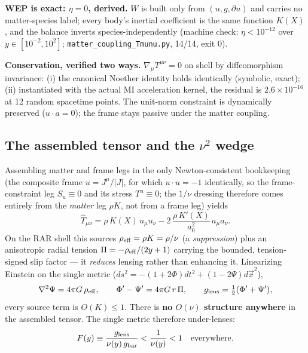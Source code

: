 \documentclass[11pt]{article}
\newcommand{\gbar}{g_{\rm bar}}
\newcommand{\glens}{g_{\rm lens}}
\begin{document}
\textbf{WEP is exact: $\eta=0$, derived.} $W$ is built only from $(u,g,\partial u)$ and carries no matter-species label; every body's inertial coefficient is the same function $K(X)$, and the balance inverts species-independently (machine check: $\eta<10^{-12}$ over $y\in[10^{-2},10^2]$; \texttt{matter\_coupling\_Tmunu.py}, 14/14, exit 0).

\textbf{Conservation, verified two ways.} $\nabla_\mu T^{\mu\nu}=0$ on shell by diffeomorphism invariance: (i) the canonical Noether identity holds identically (symbolic, exact); (ii) instantiated with the actual MI acceleration kernel, the residual is $2.6\times10^{-16}$ at 12 random spacetime points. The unit-norm constraint is dynamically preserved ($u\cdot a=0$); the frame stays passive under the matter coupling.

\subsection{The assembled tensor and the $\nu^2$ wedge}\label{sec:wedge}

Assembling matter and frame legs in the only Newton-consistent bookkeeping (the composite frame $u=J^\mu/|J|$, for which $u\cdot u=-1$ identically, so the frame-constraint leg $S_u\equiv0$ and its stress $T^u\equiv0$; the $1/\nu$ dressing therefore comes entirely from the \emph{matter} leg $\rho K$, not from a frame leg) yields
\begin{equation}
\hat T_{\mu\nu}=\rho\,K(X)\,u_\mu u_\nu-2\,\frac{\rho\,K'(X)}{a_0^2}\,a_\mu a_\nu.
\end{equation}
On the RAR shell this sources $\rho_{\rm eff}=\rho K=\rho/\nu$ (a \emph{suppression}) plus an anisotropic radial tension $\Pi=-\rho_{\rm eff}/(2y+1)$ carrying the bounded, tension-signed slip factor --- it \emph{reduces} lensing rather than enhancing it. Linearizing Einstein on the single metric ($ds^2=-(1+2\Phi)dt^2+(1-2\Psi)d\vec x^2$),
\begin{equation}
\nabla^2\Psi=4\pi G\,\rho_{\rm eff},\qquad \Phi'-\Psi'=4\pi G\,r\,\Pi,\qquad \glens=\tfrac12(\Phi'+\Psi'),
\end{equation}
every source term is $O(K)\le1$. There is \textbf{no $O(\nu)$ structure anywhere} in the assembled tensor. The single metric therefore under-lenses:
\begin{equation}
F(y)\equiv\frac{\glens}{\nu(y)\,\gbar}<\frac{1}{\nu(y)}<1\quad\text{everywhere}.
\end{equation}
\end{document}
